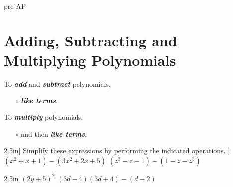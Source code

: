 \begin{taggedblock}{pre-AP}



\section{Adding, Subtracting and Multiplying Polynomials}


\begin{myCenteredBox}[colback=white,]
    To {\bfseries\itshape add} and {\bfseries\itshape subtract} polynomials,
    \begin{itemize}[nosep]
        \item[$\circ$]  {\bfseries\itshape like terms}.
    \end{itemize}
    \vspace{1em}
    To {\bfseries\itshape multiply} polynomials,
    \begin{itemize}[nosep]
        \item[$\circ$]  and then 
         {\bfseries\itshape like terms}.
    \end{itemize}
\end{myCenteredBox}




\begin{my2Problems}[\large]{2.5in}[
        Simplify these expressions by performing the indicated operations.
        ]
    {
        $ (x^2 + x + 1) - (3x^2 + 2x + 5) $
    }
    {
        $ (z^3 -z - 1) - (1 - z - z^3) $
    }
\end{my2Problems}
\begin{my2Problems}[\large]{2.5in}
    {
        $ (2y+5)^2 $
    }
    {
        $ (3d-4)(3d+4) - (d-2) $
    }
\end{my2Problems}


\end{taggedblock}
